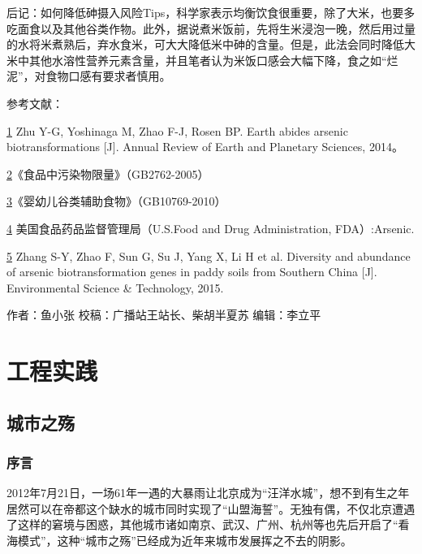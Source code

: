 \documentclass[]{book}
\begin{document}
后记：如何降低砷摄入风险Tips，科学家表示均衡饮食很重要，除了大米，也要多吃面食以及其他谷类作物。此外，据说煮米饭前，先将生米浸泡一晚，然后用过量的水将米煮熟后，弃水食米，可大大降低米中砷的含量。但是，此法会同时降低大米中其他水溶性营养元素含量，并且笔者认为米饭口感会大幅下降，食之如``烂泥''，对食物口感有要求者慎用。

参考文献：

\href{陈心想，耿增超。西北农林科技大学学报（自然科学版），2013，41:\%20167-174．}{1}
Zhu Y-G, Yoshinaga M, Zhao F-J, Rosen BP. Earth abides arsenic
biotransformations {[}J{]}. Annual Review of Earth and Planetary
Sciences, 2014。

\href{Kezhen\%20Qian,\%20Ajay\%20Kumar,\%20et.al.\%20Renew.\%20and\%20Sustain.\%20Energy\%20Reviews,\%202015,\%2042:\%201055-1064.}{2}《食品中污染物限量》（GB2762-2005）

\href{Puga\%20A\%20P,\%20Abreu\%20C\%20A,\%20et\%20al.\%20J.\%20of\%20Environ.\%20Manage.,\%202015,\%20159:\%2086–93.}{3}《婴幼儿谷类辅助食物》（GB10769-2010）

\href{Khan\%20S,\%20Cai\%20Chao,\%20et\%20al．\%20Environ.\%20Sci.\%20\&\%20Technol.,\%202013,\%2047\%20:\%208624-8632．}{4}
美国食品药品监督管理局（U.S.Food and Drug Administration, FDA）:Arsenic.

\href{Bi\%20H,\%20Huang\%20X,\%20et\%20al.\%20Small\%202014,\%2010,\%203544.}{5}
Zhang S-Y, Zhao F, Sun G, Su J, Yang X, Li H et al. Diversity and
abundance of arsenic biotransformation genes in paddy soils from
Southern China {[}J{]}. Environmental Science \& Technology, 2015.

作者：鱼小张 校稿：广播站王站长、柴胡半夏苏 编辑：李立平

\chapter{工程实践}

\section{城市之殇}

\subsection{序言}

2012年7月21日，一场61年一遇的大暴雨让北京成为``汪洋水城''，想不到有生之年居然可以在帝都这个缺水的城市同时实现了``山盟海誓''。无独有偶，不仅北京遭遇了这样的窘境与困惑，其他城市诸如南京、武汉、广州、杭州等也先后开启了``看海模式''，这种``城市之殇''已经成为近年来城市发展挥之不去的阴影。
\end{document}
